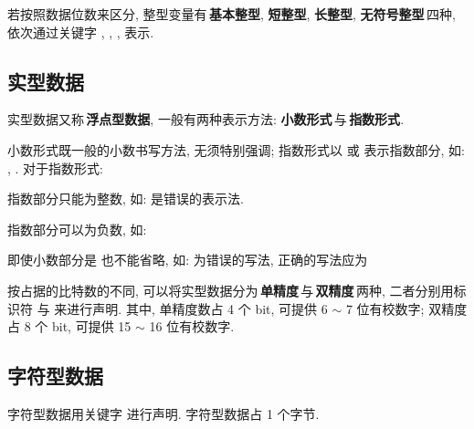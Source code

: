         \hspace*{2em} 若按照数据位数来区分, 整型变量有\,\textbf{基本整型}, \textbf{短整型}, \textbf{长整型}, \textbf{无符号整型}\,四种, 依次通过关键字 , , ,  表示.

    \subsection{实型数据}
        \hspace*{2em} 实型数据又称\,\textbf{浮点型数据}, 一般有两种表示方法: \textbf{小数形式}\,与\,\textbf{指数形式}.

        \hspace*{2em} 小数形式既一般的小数书写方法, 无须特别强调; 指数形式以  或  表示指数部分, 如: , . 对于指数形式:
            \begin{Notation}
                \item 指数部分只能为整数, 如:  是错误的表示法.
                \item 指数部分可以为负数, 如: 
                \item 即使小数部分是  也不能省略, 如:  为错误的写法, 正确的写法应为 
            \end{Notation}

        \hspace*{2em} 按占据的比特数的不同, 可以将实型数据分为\,\textbf{单精度}\,与\,\textbf{双精度}\,两种, 二者分别用标识符  与  来进行声明. 其中, 单精度数占 4 个 bit, 可提供 6 $\sim$ 7 位有校数字; 双精度占 8 个 bit, 可提供 15 $\sim$ 16 位有校数字.

    \subsection{字符型数据}
        \hspace*{2em} 字符型数据用关键字  进行声明. 字符型数据占 1 个字节.

